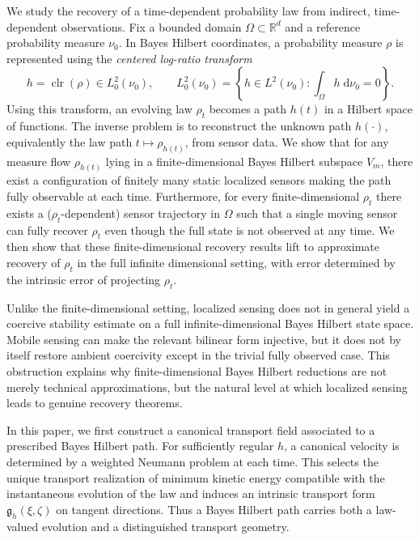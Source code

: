 \documentclass{article}
\theoremstyle{definition}
\DeclareMathOperator{\clr}{clr}
\renewcommand{\d}{\mathrm{d}}
\begin{document}
We study the recovery of a time-dependent probability law from indirect, time-dependent observations. Fix a bounded domain $\Omega \subset \mathbb{R}^d$ and a reference probability measure \(\nu_0\). In Bayes Hilbert coordinates, a probability measure $\rho$ is represented using the \emph{centered log-ratio transform} \citep{van_den_boogaart_bayes_2014}
\[
    h=\clr(\rho)\in L^2_0(\nu_0), \qquad L^2_0(\nu_0) = \left\{ h \in L^2(\nu_0) : \int_\Omega h \; \d \nu_0 = 0\right\}.
\]
Using this transform, an evolving law $\rho_t$ becomes a path $h(t)$ in a Hilbert space of functions. The inverse problem is to reconstruct the unknown path \(h(\cdot)\), equivalently the law path \(t\mapsto \rho_{h(t)}\), from sensor data. We show that for any measure flow $\rho_{h(t)}$ lying in a finite-dimensional Bayes Hilbert subspace \(V_m\), there exist a configuration of finitely many static localized sensors making the path fully observable at each time. Furthermore, for every finite-dimensional $\rho_t$ there exists a ($\rho_t$-dependent) sensor trajectory in $\Omega$ such that a single moving sensor can fully recover $\rho_t$ even though the full state is not observed at any time. We then show that these finite-dimensional recovery results lift to approximate recovery of $\rho_t$ in the full infinite dimensional setting, with error determined by the intrinsic error of projecting $\rho_t$.

Unlike the finite-dimensional setting, localized sensing does not in general yield a coercive stability estimate on a full infinite-dimensional Bayes Hilbert state space. Mobile sensing can make the relevant bilinear form injective, but it does not by itself restore ambient coercivity except in the trivial fully observed case. This obstruction explains why finite-dimensional Bayes Hilbert reductions are not merely technical approximations, but the natural level at which localized sensing leads to genuine recovery theorems.

In this paper, we first construct a canonical transport field associated to a prescribed Bayes Hilbert path. For sufficiently regular \(h\), a canonical velocity is determined by a weighted Neumann problem at each time. This selects the unique transport realization of minimum kinetic energy compatible with the instantaneous evolution of the law and induces an intrinsic transport form $\mathfrak g_h(\xi,\zeta)$ on tangent directions. Thus a Bayes Hilbert path carries both a law-valued evolution and a distinguished transport geometry.
\end{document}
